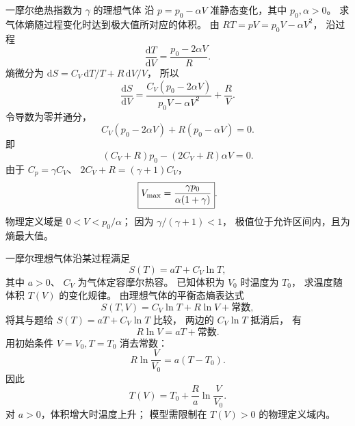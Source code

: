一摩尔绝热指数为 $\gamma$ 的理想气体
沿 $p=p_0-\alpha V$
准静态变化，其中 $p_0,\alpha>0$。
求气体熵随过程变化时达到极大值所对应的体积。
\exsolution
由
$RT=pV=p_0V-\alpha V^2$，
沿过程
\[
\frac{\mathrm dT}{\mathrm dV}
=\frac{p_0-2\alpha V}{R}.
\]
熵微分为
$\mathrm dS=C_V\,\mathrm dT/T+
R\,\mathrm dV/V$，
所以
\[
\frac{\mathrm dS}{\mathrm dV}
=\frac{C_V(p_0-2\alpha V)}
{p_0V-\alpha V^2}+\frac R V.
\]
令导数为零并通分，
\[
C_V(p_0-2\alpha V)+R(p_0-\alpha V)=0.
\]
即
\[
(C_V+R)p_0-(2C_V+R)\alpha V=0.
\]
由于 $C_p=\gamma C_V$、
$2C_V+R=(\gamma+1)C_V$，
\[
\boxed{V_{\rm max}=\frac{\gamma p_0}{\alpha(1+\gamma)}}.
\]
\excheck 物理定义域是
$0<V<p_0/\alpha$；
因为 $\gamma/(\gamma+1)<1$，
极值位于允许区间内，且为熵最大值。

一摩尔理想气体沿某过程满足
\[
S(T)=aT+C_V\ln T,
\]
其中 $a>0$、
$C_V$ 为气体定容摩尔热容。
已知体积为 $V_0$ 时温度为 $T_0$，
求温度随体积 $T(V)$ 的变化规律。
\exsolution
由理想气体的平衡态熵表达式
\[
S(T,V)=C_V\ln T+R\ln V+\text{常数},
\]
将其与题给 $S(T)=aT+C_V\ln T$ 比较，
两边的 $C_V\ln T$ 抵消后，
有
\[
R\ln V=aT+\text{常数}.
\]
用初始条件 $V=V_0,T=T_0$ 消去常数：
\[
R\ln\frac V{V_0}=a(T-T_0).
\]
因此
\[
\boxed{T(V)=T_0+\frac Ra\ln\frac V{V_0}}.
\]
\excheck 对 $a>0$，体积增大时温度上升；
模型需限制在 $T(V)>0$ 的物理定义域内。
